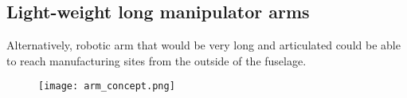 \subsection{Light-weight long manipulator arms}
\label{sec:LightWeightLongManipulatorArm}

Alternatively, robotic arm that would be very long and articulated could be able to reach manufacturing sites from the outside of the fuselage. 

\begin{figure}[H]
	\centering
		\texttt{[image: arm\_concept.png]}
	\label{fig:arm_concept}
\end{figure}